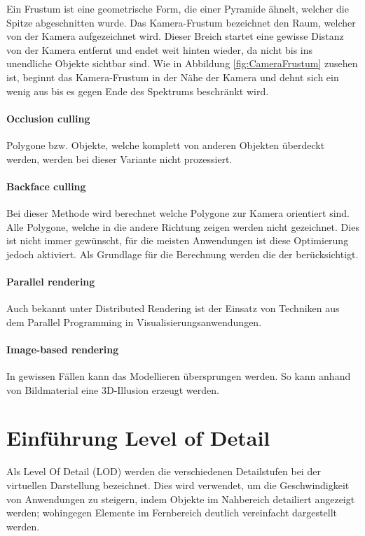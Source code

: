 Ein Frustum ist eine geometrische Form, die einer Pyramide ähnelt, welcher die Spitze abgeschnitten wurde.
Das Kamera-Frustum bezeichnet den Raum, welcher von der Kamera aufgezeichnet wird. Dieser Breich startet eine gewisse Distanz von der Kamera entfernt und endet weit hinten wieder, da nicht bis ins unendliche Objekte sichtbar sind.
Wie in Abbildung \ref{fig:CameraFrustum} zusehen ist, beginnt das Kamera-Frustum in der Nähe der Kamera und dehnt sich ein wenig aus bis es gegen Ende des Spektrums beschränkt wird.

\paragraph{Occlusion culling}
Polygone bzw. Objekte, welche komplett von anderen Objekten überdeckt werden, werden bei dieser Variante nicht prozessiert.

\paragraph{Backface culling}
\label{chap:backfaceCulling}
Bei dieser Methode wird berechnet welche Polygone zur Kamera orientiert sind.
Alle Polygone, welche in die andere Richtung zeigen werden nicht gezeichnet.
Dies ist nicht immer gewünscht, für die meisten Anwendungen ist diese Optimierung jedoch aktiviert.
Als Grundlage für die Berechnung werden die  der  berücksichtigt.

\paragraph{Parallel rendering}
Auch bekannt unter Distributed Rendering ist der Einsatz von Techniken aus dem Parallel Programming in Visualisierungsanwendungen.

\paragraph{Image-based rendering}
In gewissen Fällen kann das Modellieren übersprungen werden. So kann anhand von Bildmaterial eine 3D-Illusion erzeugt werden.

\section{Einführung Level of Detail}
\label{chap:lodIntroduction}
Als Level Of Detail (LOD) werden die verschiedenen Detailstufen bei der virtuellen Darstellung bezeichnet.
Dies wird verwendet, um die Geschwindigkeit von Anwendungen zu steigern, indem Objekte im Nahbereich detailiert angezeigt werden; wohingegen Elemente im Fernbereich deutlich vereinfacht dargestellt werden.

